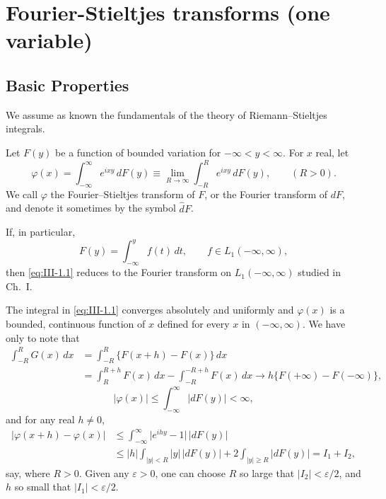 \chapter{Fourier-Stieltjes transforms (one variable)}
\label{ch:III}

\section{Basic Properties}
\label{sec:III-1}

We assume as known the fundamentals of the theory of Riemann--Stieltjes integrals.

Let $F(y)$ be a function of bounded variation for $-\infty<y<\infty$. For $x$ real, let
\begin{equation}\tag{1.1}\label{eq:III-1.1}
\varphi(x)=\int_{-\infty}^{\infty}e^{ixy}\,dF(y)\equiv\lim_{R\to\infty}\int_{-R}^{R}e^{ixy}\,dF(y),\qquad(R>0).
\end{equation}
We call $\varphi$ the Fourier--Stieltjes transform of $F$, or the Fourier transform of $dF$, and denote it sometimes by the symbol $\hat dF$.

If, in particular,
\begin{equation}\tag{1.2}\label{eq:III-1.2}
F(y)=\int_{-\infty}^{y}f(t)\,dt,\qquad f\in L_{1}(-\infty,\infty),
\end{equation}
then \eqref{eq:III-1.1} reduces to the Fourier transform on $L_{1}(-\infty,\infty)$ studied in Ch.~I.

The integral in \eqref{eq:III-1.1} converges absolutely and uniformly and $\varphi(x)$ is a bounded, continuous function of $x$ defined for every $x$ in $(-\infty,\infty)$. We have only to note that
\[
\begin{aligned}
\int_{-R}^{R}G(x)\,dx &= \int_{-R}^{R}\bigl\{F(x+h)-F(x)\bigr\}\,dx\\
&= \int_{R}^{R+h}F(x)\,dx-\int_{-R}^{-R+h}F(x)\,dx\to h\bigl\{F(+\infty)-F(-\infty)\bigr\},
\end{aligned}
\]
\[
\bigl|\varphi(x)\bigr|\le\int_{-\infty}^{\infty}\bigl|dF(y)\bigr|<\infty,
\]
and for any real $h\neq0$,
\begin{align*}
\bigl|\varphi(x+h)-\varphi(x)\bigr|
&\le\int_{-\infty}^{\infty}\bigl|e^{ihy}-1\bigr|\,\bigl|dF(y)\bigr|\\
&\le|h|\int_{|y|<R}|y|\,\bigl|dF(y)\bigr|+2\int_{|y|\ge R}\bigl|dF(y)\bigr|=I_{1}+I_{2},
\end{align*}
say, where $R>0$. Given any $\varepsilon>0$, one can choose $R$ so large that $|I_{2}|<\varepsilon/2$, and $h$ so small that $|I_{1}|<\varepsilon/2$.

